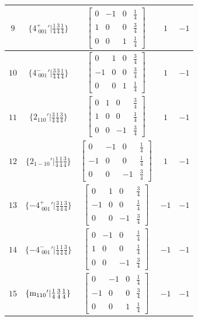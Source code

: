 \documentclass[fleqn,8pt]{jsarticle}
\begin{document}
\begin{longtable}{ccccc}
$ 9 $ & $ \{4^{+}_{\,\,001}{}'|\frac{1}{4} \frac{3}{4} \frac{1}{4}\} $ & $ \begin{bmatrix} 0 & -1 & 0 & \frac{1}{4} \\ 1 & 0 & 0 & \frac{3}{4} \\ 0 & 0 & 1 & \frac{1}{4} \end{bmatrix} $ & $ 1 $ & $ -1 $ \\ \hline
$ 10 $ & $ \{4^{-}_{\,\,001}{}'|\frac{3}{4} \frac{3}{4} \frac{1}{4}\} $ & $ \begin{bmatrix} 0 & 1 & 0 & \frac{3}{4} \\ -1 & 0 & 0 & \frac{3}{4} \\ 0 & 0 & 1 & \frac{1}{4} \end{bmatrix} $ & $ 1 $ & $ -1 $ \\ \hline
$ 11 $ & $ \{2{}_{110}{}'|\frac{3}{4} \frac{1}{4} \frac{3}{4}\} $ & $ \begin{bmatrix} 0 & 1 & 0 & \frac{3}{4} \\ 1 & 0 & 0 & \frac{1}{4} \\ 0 & 0 & -1 & \frac{3}{4} \end{bmatrix} $ & $ 1 $ & $ -1 $ \\ \hline
$ 12 $ & $ \{2{}_{1-10}{}'|\frac{1}{4} \frac{1}{4} \frac{3}{4}\} $ & $ \begin{bmatrix} 0 & -1 & 0 & \frac{1}{4} \\ -1 & 0 & 0 & \frac{1}{4} \\ 0 & 0 & -1 & \frac{3}{4} \end{bmatrix} $ & $ 1 $ & $ -1 $ \\ \hline
$ 13 $ & $ \{-4^{+}_{\,\,001}{}'|\frac{3}{4} \frac{1}{4} \frac{3}{4}\} $ & $ \begin{bmatrix} 0 & 1 & 0 & \frac{3}{4} \\ -1 & 0 & 0 & \frac{1}{4} \\ 0 & 0 & -1 & \frac{3}{4} \end{bmatrix} $ & $ -1 $ & $ -1 $ \\ \hline
$ 14 $ & $ \{-4^{-}_{\,\,001}{}'|\frac{1}{4} \frac{1}{4} \frac{3}{4}\} $ & $ \begin{bmatrix} 0 & -1 & 0 & \frac{1}{4} \\ 1 & 0 & 0 & \frac{1}{4} \\ 0 & 0 & -1 & \frac{3}{4} \end{bmatrix} $ & $ -1 $ & $ -1 $ \\ \hline
$ 15 $ & $ \{{\rm m}_{110}{}'|\frac{1}{4} \frac{3}{4} \frac{1}{4}\} $ & $ \begin{bmatrix} 0 & -1 & 0 & \frac{1}{4} \\ -1 & 0 & 0 & \frac{3}{4} \\ 0 & 0 & 1 & \frac{1}{4} \end{bmatrix} $ & $ -1 $ & $ -1 $ \\ \hline

\end{longtable}
\end{document}
